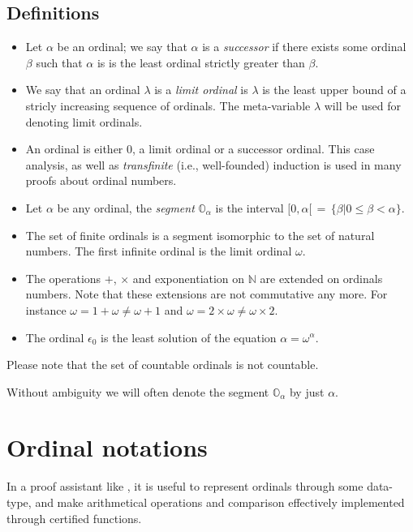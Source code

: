 \subsection{Definitions}

\begin{itemize}
\item Let  $\alpha$ be an ordinal; we say that  $\alpha$ is a \emph{successor} if there exists some ordinal  $\beta$ such that 
$\alpha$ is is the least ordinal strictly greater than  $\beta$.

\item We say that an ordinal $\lambda$ is a \emph{limit ordinal} is $\lambda$  is the least upper bound of a stricly increasing sequence of ordinals.
The meta-variable $\lambda$ will be used for denoting  limit ordinals.

\item {}
An ordinal is either $0$, a limit ordinal or a successor ordinal. This case analysis, as well as \emph{transfinite} ({i.e.}, well-founded) induction is used in many proofs about ordinal numbers.

\item Let $\alpha$ be any ordinal, the \emph{segment} $\mathbb{O}_\alpha$ is the
interval $[0,\alpha[\,=\,\{\beta|0\leq\beta<\alpha\}$. 

\item The set  of finite ordinals is a segment isomorphic to the set of natural numbers.
 The first infinite ordinal is the limit ordinal $\omega$.
 
\item The operations $+$, $\times$ and exponentiation on $\mathbb{N}$ are extended on ordinals numbers. Note that these  extensions are not commutative any more.  For instance $\omega = 1 + \omega \not= \omega + 1$
and $\omega = 2 \times \omega \not= \omega \times 2$.

\item The ordinal $\epsilon_0$ is the least solution of the equation
 \(\alpha=\omega^{\alpha}\).
\end{itemize}


Please note that the set of countable ordinals is not countable. 

Without ambiguity we will often denote the segment $\mathbb{O}_\alpha$ by just $\alpha$.
 


\section{Ordinal notations}
In a proof assistant like \coq{},  it is useful to represent ordinals through some data-type, and make arithmetical operations and comparison effectively implemented  through certified functions.

